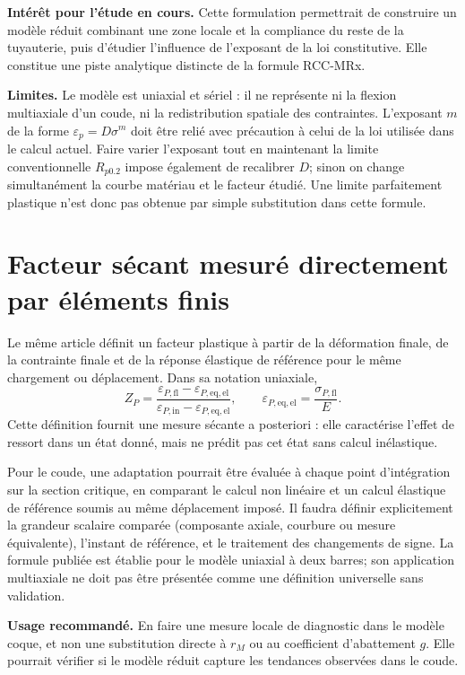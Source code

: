 \documentclass[11pt,a4paper]{article}
\begin{document}
\textbf{Intérêt pour l'étude en cours.} Cette formulation permettrait de
construire un modèle réduit combinant une zone locale et la compliance du reste
de la tuyauterie, puis d'étudier l'influence de l'exposant de la loi
constitutive. Elle constitue une piste analytique distincte de la formule
RCC-MRx.

\textbf{Limites.} Le modèle est uniaxial et sériel : il ne représente ni la
flexion multiaxiale d'un coude, ni la redistribution spatiale des contraintes.
L'exposant \(m\) de la forme \(\varepsilon_p=D\sigma^m\) doit être relié avec
précaution à celui de la loi utilisée dans le calcul actuel. Faire varier
l'exposant tout en maintenant la limite conventionnelle \(R_{p0.2}\) impose
également de recalibrer \(D\); sinon on change simultanément la courbe
matériau et le facteur étudié. Une limite parfaitement plastique n'est donc
pas obtenue par simple substitution dans cette formule.

\section{Facteur sécant mesuré directement par éléments finis}

Le même article définit un facteur plastique à partir de la déformation
finale, de la contrainte finale et de la réponse élastique de référence pour le
même chargement ou déplacement. Dans sa notation uniaxiale,
\[
  Z_P =
  \frac{\varepsilon_{P,\mathrm{fl}}-\varepsilon_{P,\mathrm{eq,el}}}
       {\varepsilon_{P,\mathrm{in}}-\varepsilon_{P,\mathrm{eq,el}}},
  \qquad
  \varepsilon_{P,\mathrm{eq,el}}=\frac{\sigma_{P,\mathrm{fl}}}{E}.
\]
Cette définition fournit une mesure sécante a posteriori : elle caractérise
l'effet de ressort dans un état donné, mais ne prédit pas cet état sans calcul
inélastique.

Pour le coude, une adaptation pourrait être évaluée à chaque point d'intégration
sur la section critique, en comparant le calcul non linéaire et un calcul
élastique de référence soumis au même déplacement imposé. Il faudra définir
explicitement la grandeur scalaire comparée (composante axiale, courbure ou
mesure équivalente), l'instant de référence, et le traitement des changements
de signe. La formule publiée est établie pour le modèle uniaxial à deux barres;
son application multiaxiale ne doit pas être présentée comme une définition
universelle sans validation.

\textbf{Usage recommandé.} En faire une mesure locale de diagnostic dans le
modèle coque, et non une substitution directe à \(r_M\) ou au coefficient
d'abattement \(g\). Elle pourrait vérifier si le modèle réduit capture les
tendances observées dans le coude.
\end{document}
